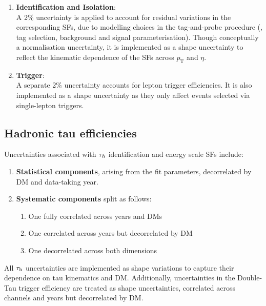 \begin{enumerate}[label=(\roman*)]
\item \textbf{Identification and Isolation}: \\
A 2\% uncertainty is applied to account for residual variations in the corresponding SFs, due to modelling choices in the tag-and-probe procedure (\eg, tag selection, background and signal parameterisation). Though conceptually a normalisation uncertainty, it is implemented as a shape uncertainty to reflect the kinematic dependence of the SFs across $p_{\mathrm{T}}$ and $\eta$.

\item \textbf{Trigger}: \\
A separate 2\% uncertainty accounts for lepton trigger efficiencies. It is also implemented as a shape uncertainty as they only affect events selected via single-lepton triggers.

\end{enumerate}

\subsection{Hadronic tau efficiencies}

Uncertainties associated with $\tau_h$ identification and energy scale SFs include:

\begin{enumerate}[label=(\roman*)]
\item \textbf{Statistical components}, arising from the fit parameters, decorrelated by \ac{DM} and data-taking year.

\item \textbf{Systematic components} split as follows:
\begin{enumerate}
    \item One fully correlated across years and DMs
    \item One correlated across years but decorrelated by DM
    \item One decorrelated across both dimensions
\end{enumerate}
\end{enumerate}

All $\tau_\mathrm{h}$ uncertainties are implemented as shape variations to capture their dependence on tau kinematics and \ac{DM}. Additionally, uncertainties in the Double-Tau trigger efficiency are treated as shape uncertainties, correlated across channels and years but decorrelated by \ac{DM}.

